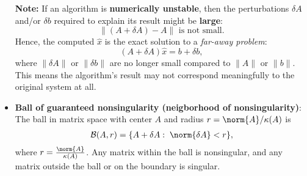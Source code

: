 \documentclass{report}
\begin{document}
\begin{itemize}
        \textbf{Note:} If an algorithm is \textbf{numerically unstable}, then the perturbations 
        $\delta A$ and/or $\delta b$ required to explain its result might be \textbf{large}:
        \[
            \|(A + \delta A) - A\| \text{ is not small.}
        \]
        Hence, the computed $\hat{x}$ is the exact solution to a \textit{far-away problem}:
        \[
            (A + \delta A)\hat{x} = b + \delta b,
        \]
        where $\|\delta A\|$ or $\|\delta b\|$ are no longer small compared to 
        $\|A\|$ or $\|b\|$.
        \bigbreak \noindent 
        This means the algorithm’s result may not correspond meaningfully to the 
        original system at all.
        \item \textbf{Ball of guaranteed nonsingularity (neigborhood of nonsingularity)}: The ball in matrix space with center $A$ and radius $r = \norm{A} / \kappa(A)$ is
        \begin{align*}
            \mathcal{B}(A,r) = \{A + \delta  A:\; \norm{\delta A} < r\},
        \end{align*}
        where $r = \frac{\norm{A}}{\kappa(A)} $. Any matrix within the ball is nonsingular, and any matrix outside the ball or on the boundary is singular.




    \end{itemize}

    \pagebreak 
\end{document}
